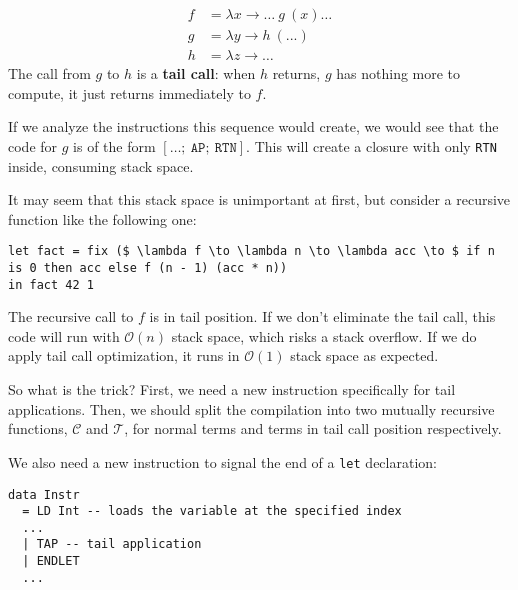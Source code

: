\[
\begin{aligned}
f &= \lambda x \to \dots \ g \ (x) \dots \\
g &= \lambda y \to h \ (...) \\
h &= \lambda z \to \dots
\end{aligned}
\]
The call from $g$ to $h$ is a \textbf{tail call}: when $h$ returns, $g$ has nothing more to
compute, it just returns immediately to $f$.

If we analyze the instructions this sequence would create, we would see that the code
for $g$ is of the form $ [\dots;\ \texttt{AP};\ \texttt{RTN}] $. This will create a closure with only
\texttt{RTN} inside, consuming stack space.

It may seem that this stack space is unimportant at first, but consider a recursive function
like the following one:

\begin{lstlisting}[mathescape]
let fact = fix ($ \lambda f \to \lambda n \to \lambda acc \to $ if n is 0 then acc else f (n - 1) (acc * n))
in fact 42 1
\end{lstlisting}

The recursive call to $ f $ is in tail position. If we don't eliminate the tail call,
this code will run with $\mathcal{O}(n)$ stack space, which risks a stack overflow. If we
do apply tail call optimization, it runs in $\mathcal{O}(1)$ stack space as expected.

So what is the trick? First, we need a new instruction specifically for tail applications.
Then, we should split the compilation into two mutually recursive functions, $\mathcal{C}$ and $\mathcal{T}$, for normal terms
and terms in tail call position respectively.

\newpage

We also need a new instruction to signal the end of a \texttt{let} declaration:

\begin{lstlisting}
data Instr
  = LD Int -- loads the variable at the specified index 
  ...
  | TAP -- tail application
  | ENDLET
  ...
\end{lstlisting}

